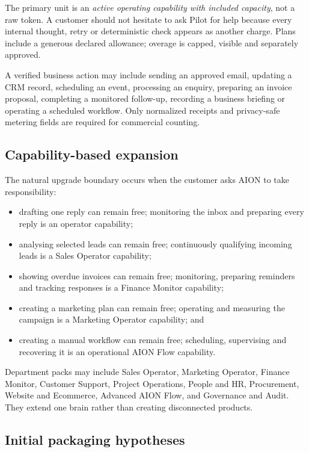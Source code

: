 The primary unit is an \emph{active operating capability with included capacity}, not a raw token.
A customer should not hesitate to ask Pilot for help because every internal thought, retry or
deterministic check appears as another charge. Plans include a generous declared allowance;
overage is capped, visible and separately approved.

A verified business action may include sending an approved email, updating a CRM record,
scheduling an event, processing an enquiry, preparing an invoice proposal, completing a monitored
follow-up, recording a business briefing or operating a scheduled workflow. Only normalized
receipts and privacy-safe metering fields are required for commercial counting.

\subsection{Capability-based expansion}

The natural upgrade boundary occurs when the customer asks AION to take responsibility:

\begin{itemize}
  \item drafting one reply can remain free; monitoring the inbox and preparing every reply is an
        operator capability;
  \item analysing selected leads can remain free; continuously qualifying incoming leads is a
        Sales Operator capability;
  \item showing overdue invoices can remain free; monitoring, preparing reminders and tracking
        responses is a Finance Monitor capability;
  \item creating a marketing plan can remain free; operating and measuring the campaign is a
        Marketing Operator capability; and
  \item creating a manual workflow can remain free; scheduling, supervising and recovering it is
        an operational AION Flow capability.
\end{itemize}

Department packs may include Sales Operator, Marketing Operator, Finance Monitor, Customer
Support, Project Operations, People and HR, Procurement, Website and Ecommerce, Advanced AION
Flow, and Governance and Audit. They extend one brain rather than creating disconnected products.

\subsection{Initial packaging hypotheses}

